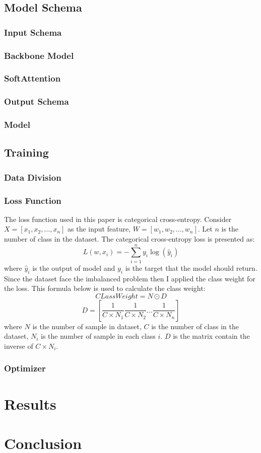 \subsection{Model Schema}
\subsubsection{Input Schema}
\subsubsection{Backbone Model}
\subsubsection{SoftAttention}
\subsubsection{Output Schema}
\subsubsection{Model}

\subsection{Training}
\subsubsection{Data Division}
\subsubsection{Loss Function}
The loss function used in this paper is categorical cross-entropy. Consider $X = [x_1, x_2, \dots, x_n]$ as the input feature, $W = [w_1, w_2, \dots, w_n]$. Let $n$ is the number of class in the dataset. The categorical cross-entropy loss is presented as:
\[L(w, x_i) = -\sum_{i=1}^{n}y_i\log(\hat{y}_i)\]
where $\hat{y}_i$  is the output of model and $y_i$ is the target that the model should return. \\
Since the dataset face the imbalanced problem then I applied the class weight for the loss. This formula below is used to calculate the class weight:
\[CLassWeight = N \odot D\]
\[D = [\frac{1}{C \times  N_1}  \frac{1}{C \times  N_2}  \dots \frac{1}{C \times  N_n}]\]
where $N$ is the number of sample in dataset, $C$ is the number of class in the dataset, $N_i$ is the number of sample in each class $i$. $D$ is the matrix contain the inverse of $C \times N_i$.
\subsubsection{Optimizer}
\section{Results}

\section{Conclusion}
\cite{08332}
\clearpage
\pagebreak
